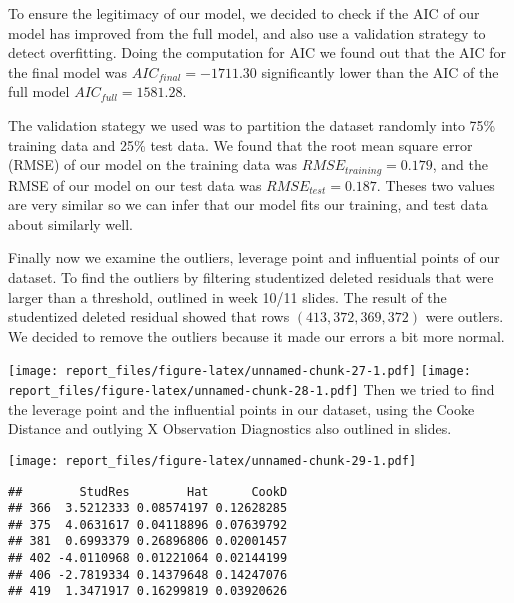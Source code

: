 \documentclass[]{article}
\newenvironment{Shaded}{\begin{snugshade}}{\end{snugshade}}
\newcommand{\KeywordTok}[1]{\textcolor[rgb]{0.13,0.29,0.53}{\textbf{#1}}}
\newcommand{\DataTypeTok}[1]{\textcolor[rgb]{0.13,0.29,0.53}{#1}}
\newcommand{\StringTok}[1]{\textcolor[rgb]{0.31,0.60,0.02}{#1}}
\newcommand{\CommentTok}[1]{\textcolor[rgb]{0.56,0.35,0.01}{\textit{#1}}}
\newcommand{\OperatorTok}[1]{\textcolor[rgb]{0.81,0.36,0.00}{\textbf{#1}}}
\newcommand{\NormalTok}[1]{#1}
\begin{document}
To ensure the legitimacy of our model, we decided to check if the AIC of
our model has improved from the full model, and also use a validation
strategy to detect overfitting. Doing the computation for AIC we found
out that the AIC for the final model was \(AIC_{final} = -1711.30\)
significantly lower than the AIC of the full model
\(AIC_{full} = 1581.28\).

The validation stategy we used was to partition the dataset randomly
into 75\% training data and 25\% test data. We found that the root mean
square error (RMSE) of our model on the training data was
\(RMSE_{training} = 0.179\), and the RMSE of our model on our test data
was \(RMSE_{test}=0.187\). Theses two values are very similar so we can
infer that our model fits our training, and test data about similarly
well.

Finally now we examine the outliers, leverage point and influential
points of our dataset. To find the outliers by filtering studentized
deleted residuals that were larger than a threshold, outlined in week
10/11 slides. The result of the studentized deleted residual showed that
rows \((413, 372, 369, 372)\) were outlers. We decided to remove the
outliers because it made our errors a bit more normal.

\texttt{[image: report\_files/figure-latex/unnamed-chunk-27-1.pdf]}
\texttt{[image: report\_files/figure-latex/unnamed-chunk-28-1.pdf]} Then
we tried to find the leverage point and the influential points in our
dataset, using the Cooke Distance and outlying X Observation Diagnostics
also outlined in slides.

\begin{Shaded}
\end{Shaded}

\texttt{[image: report\_files/figure-latex/unnamed-chunk-29-1.pdf]}

\begin{verbatim}
##        StudRes        Hat      CookD
## 366  3.5212333 0.08574197 0.12628285
## 375  4.0631617 0.04118896 0.07639792
## 381  0.6993379 0.26896806 0.02001457
## 402 -4.0110968 0.01221064 0.02144199
## 406 -2.7819334 0.14379648 0.14247076
## 419  1.3471917 0.16299819 0.03920626
\end{verbatim}
\end{document}
